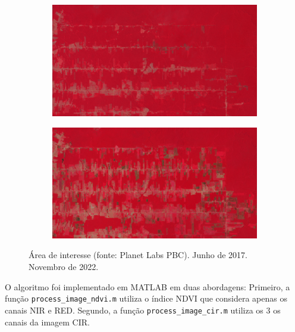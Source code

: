 \documentclass[11pt]{article}
\begin{document}
\begin{figure}[!htb]
	\centering
	\begin{subfigure}[b]{.45\textwidth}
		\centering
		\includegraphics[width=\textwidth]{candeias_junho_2017_cir.png}
		\caption{}
		\label{fig:candeias_junho_2017_cir}
	\end{subfigure}
	\begin{subfigure}[b]{.45\textwidth}
		\centering
		\includegraphics[width=\textwidth]{candeias_nov_2022_cir.png}
		\caption{}
		\label{fig:candeias_nov_2022_cir}
	\end{subfigure}
	
	\caption{Área de interesse (fonte: Planet Labs PBC).  Junho de 2017.  Novembro de 2022.}
	\label{fig:candeias_imagens_cir}
\end{figure}

O algoritmo foi implementado em MATLAB em duas abordagens: Primeiro, a função \verb|process_image_ndvi.m| utiliza o índice NDVI que considera apenas os canais NIR e RED. Segundo, a função \verb|process_image_cir.m| utiliza os 3 os canais da imagem CIR.
\end{document}
